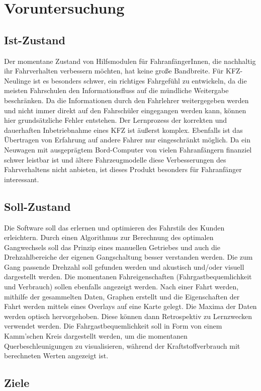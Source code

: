 \chapter{Voruntersuchung}

\section{Ist-Zustand}
Der momentane Zustand von Hilfsmodulen für FahranfängerInnen, die nachhaltig ihr Fahrverhalten verbessern möchten, hat keine große Bandbreite. Für KFZ-Neulinge ist es besonders schwer, ein richtiges Fahrgefühl zu entwickeln, da die meisten Fahrschulen den Informationsfluss auf die mündliche Weitergabe beschränken. Da die Informationen durch den Fahrlehrer weitergegeben werden und nicht immer direkt auf den Fahrschüler eingegangen werden kann, können hier grundsätzliche Fehler entstehen. Der Lernprozess der korrekten und dauerhaften Inbetriebnahme eines KFZ ist äußerst komplex. Ebenfalls ist das Übertragen von Erfahrung auf andere Fahrer nur eingeschränkt möglich.
Da ein Neuwagen mit ausgeprägtem Bord-Computer von vielen Fahranfängern finanziel schwer leistbar ist und ältere Fahrzeugmodelle diese Verbesserungen des Fahrverhaltens nicht anbieten, ist dieses Produkt besonders für Fahranfänger interessant.

\section{Soll-Zustand}
Die Software soll das erlernen und optimieren des Fahrstils des Kunden erleichtern. Durch einen Algorithmus zur Berechnung des optimalen Gangwechsels soll das Prinzip eines manuellen Getriebes und auch die Drehzahlbereiche der eigenen Gangschaltung besser verstanden werden. Die zum Gang passende Drehzahl soll gefunden werden und akustisch und/oder visuell dargestellt werden. Die momentanen Fahreigenschaften (Fahrgastbequemlichkeit und Verbrauch) sollen ebenfalls angezeigt werden. \newpage Nach einer Fahrt werden, mithilfe der gesammelten Daten, Graphen erstellt und die Eigenschaften der Fahrt werden mittels eines Overlays auf eine Karte gelegt. Die Maxima der Daten werden optisch hervorgehoben. Diese können dann Retrospektiv zu Lernzwecken verwendet werden. Die Fahrgastbequemlichkeit soll in Form von einem Kamm'schen Kreis dargestellt werden, um die momentanen Querbeschleunigungen zu visualisieren, während der Kraftstoffverbrauch mit berechneten Werten angezeigt ist.

\section{Ziele}
